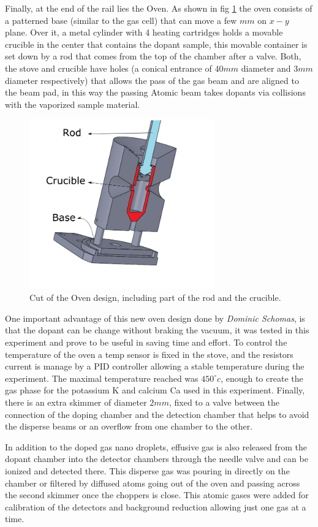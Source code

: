 Finally, at the end of the rail lies the Oven. As shown in fig \ref{img:oven} the oven consists of a patterned base (similar to the gas cell) that can  move a few $mm$ on $x-y$ plane. Over it, a metal cylinder with 4 heating cartridges holds a movable crucible in the center that contains the dopant sample, this movable container is set down by a rod that comes from the top of the chamber after a valve. Both, the stove and crucible have holes (a conical entrance of $40mm$ diameter and $3mm$ diameter respectively) that allows the pass of the gas beam and are aligned to the beam pad, in this way  the passing Atomic beam takes dopants via collisions with the vaporized sample material.

\begin{figure}[h!] 
\centering
\includegraphics[width=8cm]{../Images/oven_complete_cut_2.PNG}
\caption{Cut of the Oven design, including part of the rod and the crucible.}
\label{img:oven}
\end{figure}

One important advantage of this new oven design done by \textit{Dominic Schomas},  is that the dopant can be change without braking the vacuum, it was tested in this experiment and prove to be useful in saving time and effort. To control the temperature of the oven a temp sensor is fixed in the stove, and the resistors current is manage by a PID controller allowing a stable temperature during the experiment. The maximal temperature reached was $450^{\circ}c$,  enough to create the gas phase for the potassium K and calcium Ca used in this experiment. Finally, there is an extra skimmer of diameter $2mm$, fixed to a valve between the connection of the doping chamber and the detection chamber that helps to avoid the disperse beams or an overflow from one chamber to the other.

In addition to the doped gas nano droplets, effusive gas is also released from the dopant chamber into the detector chambers through the needle valve and can be ionized and detected there. This disperse gas was pouring in directly on the chamber or filtered by diffused atoms going out of the oven and passing across the second skimmer once the choppers is close. This atomic gases were added for calibration of the detectors and background reduction allowing just one gas at a time.

